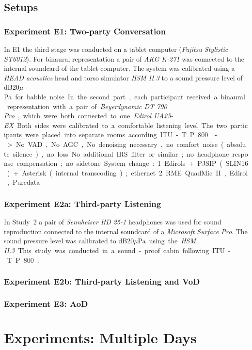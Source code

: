 \subsection{Setups}

\subsubsection{Experiment E1: Two-party Conversation}
In E1 the third stage was conducted on a tablet computer (\emph{Fujitsu Stylistic ST6012}).
For binaural representation a pair of \emph{AKG K-271} was connected to the internal soundcard of the tablet computer.
The system was calibrated using a \emph{HEAD acoustics} head and torso simulator \emph{HSM II.3} to a sound pressure level of \unit[75]{dB20$\mu$Pa} for babble noise.
In the second part, each participant received a binaural representation with a pair of \emph{Beyerdynamic DT 790 Pro}, which were both connected to one \emph{Edirol UA25-EX}.
Both sides were calibrated to a comfortable listening level.
The two participants were placed into separate rooms according ITU-T P.800~\citep{itu-t_p.800:_1996}.

-> No VAD, No AGC, No denoising necessary, no comfort noise (absolute silence), no loss
No additional IRS filter or similar; no headphone response compensation; no sidetone.

System change: 
1. Edirols  + PJSIP (SLIN16) + Asterisk (internal transcoding); ethernet
2. RME QuadMic II, Edirol, Puredata  


\subsubsection{Experiment E2a: Third-party Listening}

In Study~2 a pair of \emph{Sennheiser HD 25-1} headphones was used for sound reproduction connected to the internal soundcard of a \emph{Microsoft Surface Pro}.
The sound pressure level was calibrated to \unit[75]{dB20$\mu$Pa} using the \emph{HSM II.3}.
This study was conducted in a sound-proof cabin following ITU-T P.800~\citep{itu-t_p.800:_1996}.

\subsubsection{Experiment E2b: Third-party Listening and \ac{VoD}}


\subsubsection{Experiment E3: \ac{AoD}}


\section{Experiments: Multiple Days}



